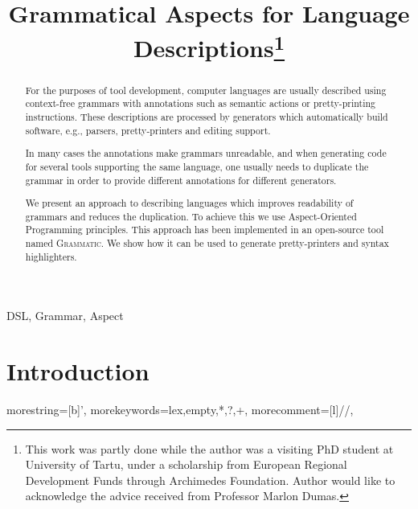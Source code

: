 \documentclass{IOS-Book-Article}     %
\newcommand{\tool}[1]{\textsc{#1}}
\newcommand{\Grammatic}[0]{\tool{Grammatic}}
\begin{document}
\begin{frontmatter}          %
%
\title{Grammatical Aspects for Language Descriptions\thanks{This work was partly done while the author was a visiting PhD student at University of Tartu, under a scholarship from European Regional Development Funds through Archimedes Foundation. Author would like to acknowledge the advice received from Professor Marlon Dumas.}}

\author{ }
\address{ITMO University, Saint-Petersburg, Russia}
%
\begin{abstract}
	For the purposes of tool development, computer languages are usually described using context-free grammars with annotations such as semantic actions or pretty-printing instructions. 
	These descriptions are processed by generators which automatically build software, e.g., parsers, pretty-printers and editing support.

	In many cases the annotations make grammars unreadable, and when generating code for several tools supporting the same language, one usually needs to duplicate the grammar in order to provide different annotations for different generators.

	We present an approach to describing languages which improves readability of grammars and reduces the duplication. To achieve this we use Aspect-Oriented Programming principles. This approach has been implemented in an open-source tool named \Grammatic{}. We show how it can be used to generate pretty-printers and syntax highlighters.
\end{abstract}

\begin{keyword}
DSL, Grammar, Aspect
\end{keyword}

\end{frontmatter}

\section*{Introduction}

	{
		morestring=[b]',
		morekeywords={lex,empty,*,?,+},
		morecomment=[l]{//},
	}
\end{document}
